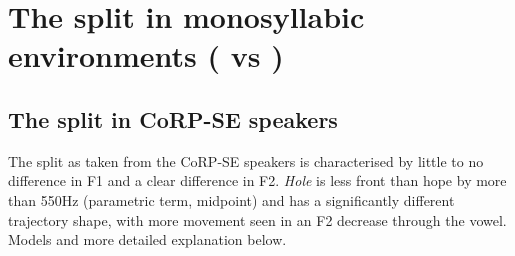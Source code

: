 \documentclass[../../../00.FullDoc/tex/Thesis]{subfiles}
\begin{document}
%
%
%
%
%
%


\section{The \goat{} split in monosyllabic environments (\hope{} vs \hole{})} \label{sec:GGGOATsplit}


\subsection{The \GG{} split in CoRP-SE speakers}
The \GG{} split as taken from the CoRP-SE speakers is characterised by little to no difference in F1 and a clear difference in F2. \textit{Hole} is less front than hope by more than 550Hz (parametric term, midpoint) and has a significantly different trajectory shape, with more movement seen in an F2 decrease through the vowel. Models and more detailed explanation below.
\end{document}
